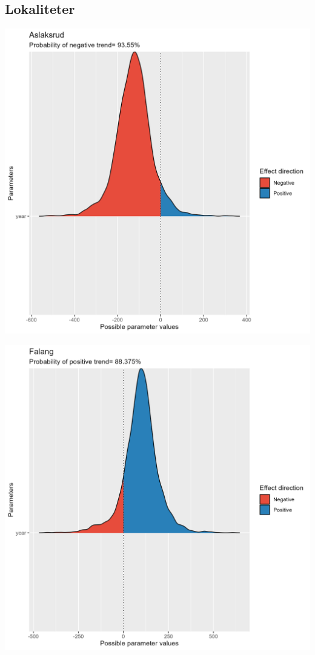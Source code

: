 \documentclass[
  letterpaper,
  DIV=11,
  numbers=noendperiod]{scrreport}
\begin{document}
\hypertarget{lokaliteter}{%
\subsection{Lokaliteter}\label{lokaliteter}}

\includegraphics{data/derived_data/direction_plots/plots/Aslaksrud.png}

\includegraphics{data/derived_data/direction_plots/plots/Falang.png}
\end{document}
